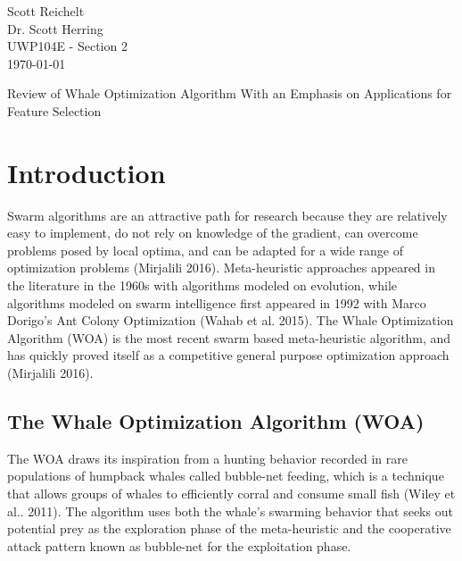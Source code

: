 \documentclass[11pt]{article}
\begin{document}
    \thispagestyle{empty}
    \begin{flushleft}
        Scott Reichelt\\
        Dr. Scott Herring\\
        UWP104E - Section 2\\
        \today\\
    \end{flushleft}
    \vspace{1em}
    \begin{center}
		Review of Whale Optimization Algorithm With an Emphasis on Applications for Feature Selection
    \end{center}

\section*{Introduction}
Swarm algorithms are an attractive path for research because they are relatively easy to implement, do not rely on knowledge of the gradient, can overcome problems posed by local optima, and can be adapted for a wide range of optimization problems (Mirjalili 2016).
Meta-heuristic approaches appeared in the literature in the 1960s with algorithms modeled on evolution, while algorithms modeled on swarm intelligence first appeared in 1992 with Marco Dorigo's Ant Colony Optimization (Wahab et al. 2015).
The Whale Optimization Algorithm (WOA) is the most recent swarm based meta-heuristic algorithm, and has quickly proved itself as a competitive general purpose optimization approach (Mirjalili 2016).

\subsection*{The Whale Optimization Algorithm (WOA)}
The WOA draws its inspiration from a hunting behavior recorded in rare populations of humpback whales called bubble-net feeding, which is a technique that allows groups of whales to efficiently corral and consume small fish (Wiley et al.. 2011).
The algorithm uses both the whale's swarming behavior that seeks out potential prey as the exploration phase of the meta-heuristic and the cooperative attack pattern known as bubble-net for the exploitation phase.
\end{document}

